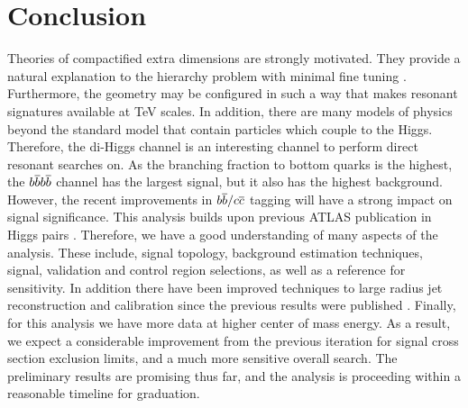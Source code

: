 \documentclass[12pt]{article}
\begin{document}
\section{Conclusion}
Theories of compactified extra dimensions are strongly motivated. They provide a
natural explanation to the hierarchy problem with minimal fine tuning
\cite{RandallSundrumOriginal, bsm}. Furthermore, the geometry may be configured
in such a way that makes resonant signatures available at TeV scales. In
addition, there are many models of physics beyond the standard model that
contain particles which couple to the Higgs. Therefore, the di-Higgs channel is
an interesting channel to perform direct resonant searches on. As the branching
fraction to bottom quarks is the highest, the $b\overline{b}b\overline{b}$ channel has the largest
signal, but it also has the highest background. However, the recent improvements
in $b\overline{b}/c\overline{c}$ tagging will have a strong impact on signal significance.
This analysis builds upon previous ATLAS publication in Higgs pairs
\cite{atlas_resonant_2022, atlas_hhbbbb_vbf}. Therefore, we have a good
understanding of many aspects of the analysis. These include, signal topology,
background estimation techniques, signal, validation and control region
selections, as well as a reference for sensitivity. In addition there have been
improved techniques to large radius jet reconstruction and calibration since the
previous results were published \cite{large_r_jet}. Finally, for this analysis
we have more data at higher center of mass energy. As a result, we expect a
considerable improvement from the previous iteration for signal cross section
exclusion limits, and a much more sensitive overall search. The preliminary
results are promising thus far, and the analysis is proceeding within a
reasonable timeline for graduation.


\newpage


\end{document}
